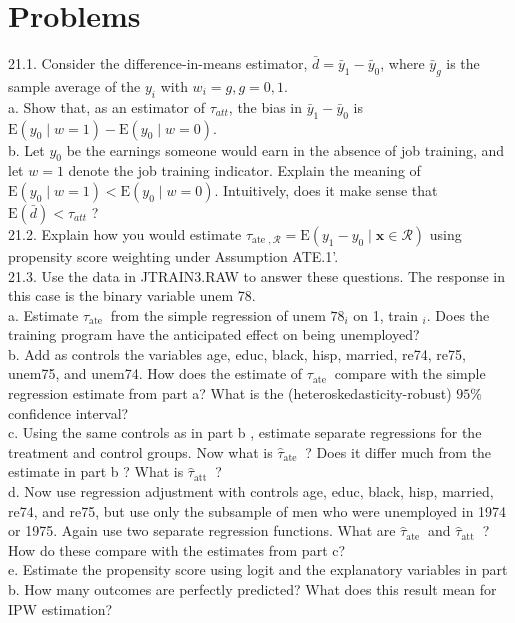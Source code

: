 \documentclass[10pt]{article}
\begin{document}
\section*{Problems}
21.1. Consider the difference-in-means estimator, $\bar{d}=\bar{y}_{1}-\bar{y}_{0}$, where $\bar{y}_{g}$ is the sample average of the $y_{i}$ with $w_{i}=g, g=0,1$.\\
a. Show that, as an estimator of $\tau_{a t t}$, the bias in $\bar{y}_{1}-\bar{y}_{0}$ is $\mathrm{E}\left(y_{0} \mid w=1\right)- \mathrm{E}\left(y_{0} \mid w=0\right)$.\\
b. Let $y_{0}$ be the earnings someone would earn in the absence of job training, and let $w=1$ denote the job training indicator. Explain the meaning of $\mathrm{E}\left(y_{0} \mid w=1\right)< \mathrm{E}\left(y_{0} \mid w=0\right)$. Intuitively, does it make sense that $\mathrm{E}(\bar{d})<\tau_{a t t}$ ?\\
21.2. Explain how you would estimate $\tau_{\text {ate }, \mathscr{R}}=\mathrm{E}\left(y_{1}-y_{0} \mid \mathbf{x} \in \mathscr{R}\right)$ using propensity score weighting under Assumption ATE.1'.\\
21.3. Use the data in JTRAIN3.RAW to answer these questions. The response in this case is the binary variable unem 78.\\
a. Estimate $\tau_{\text {ate }}$ from the simple regression of unem $78_{i}$ on 1, train $_{i}$. Does the training program have the anticipated effect on being unemployed?\\
b. Add as controls the variables age, educ, black, hisp, married, re74, re75, unem75, and unem74. How does the estimate of $\tau_{\text {ate }}$ compare with the simple regression estimate from part a? What is the (heteroskedasticity-robust) $95 \%$ confidence interval?\\
c. Using the same controls as in part b , estimate separate regressions for the treatment and control groups. Now what is $\hat{\tau}_{\text {ate }}$ ? Does it differ much from the estimate in part b ? What is $\hat{\tau}_{\text {att }}$ ?\\
d. Now use regression adjustment with controls age, educ, black, hisp, married, re74, and re75, but use only the subsample of men who were unemployed in 1974 or 1975. Again use two separate regression functions. What are $\hat{\tau}_{\text {ate }}$ and $\hat{\tau}_{\text {att }}$ ? How do these compare with the estimates from part c?\\
e. Estimate the propensity score using logit and the explanatory variables in part b. How many outcomes are perfectly predicted? What does this result mean for IPW estimation?\\
\end{document}
